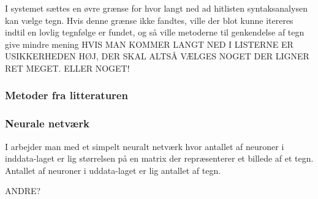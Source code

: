I systemet sættes en øvre grænse for hvor langt ned ad hitlisten syntaksanalysen kan vælge tegn. Hvis denne grænse ikke fandtes, ville der blot kunne itereres indtil en lovlig tegnfølge er fundet, og så ville metoderne til genkendelse af tegn give mindre mening HVIS MAN KOMMER LANGT NED I LISTERNE ER USIKKERHEDEN HØJ, DER SKAL ALTSÅ VÆLGES NOGET DER LIGNER RET MEGET. ELLER NOGET!

\subsubsection{Metoder fra litteraturen}

\subsubsection*{Neurale netværk}
I \cite{kwas} arbejder man med et simpelt neuralt netværk hvor antallet af neuroner i inddata-laget er lig størrelsen på en matrix der repræsenterer et billede af et tegn. Antallet af neuroner i uddata-laget er lig antallet af tegn.

ANDRE?
